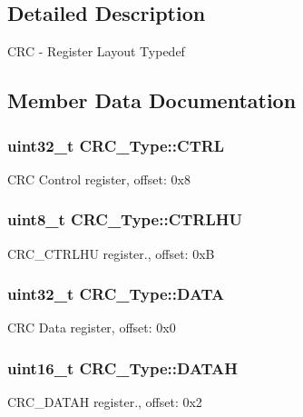 \subsection{Detailed Description}
C\+RC -\/ Register Layout Typedef 

\subsection{Member Data Documentation}
\subsubsection[{\texorpdfstring{C\+T\+RL}{CTRL}}]{ uint32\+\_\+t C\+R\+C\+\_\+\+Type\+::\+C\+T\+RL}\hypertarget{structCRC__Type_a147efe24d7fb3a460223461ecfedc883}{}\label{structCRC__Type_a147efe24d7fb3a460223461ecfedc883}
C\+RC Control register, offset\+: 0x8 
\subsubsection[{\texorpdfstring{C\+T\+R\+L\+HU}{CTRLHU}}]{ uint8\+\_\+t C\+R\+C\+\_\+\+Type\+::\+C\+T\+R\+L\+HU}\hypertarget{structCRC__Type_a50453164cb07ea98463dff9a9ee93a94}{}\label{structCRC__Type_a50453164cb07ea98463dff9a9ee93a94}
C\+R\+C\+\_\+\+C\+T\+R\+L\+HU register., offset\+: 0xB 
\subsubsection[{\texorpdfstring{D\+A\+TA}{DATA}}]{ uint32\+\_\+t C\+R\+C\+\_\+\+Type\+::\+D\+A\+TA}\hypertarget{structCRC__Type_a9c6ce5850e78685541e9476bd77b1710}{}\label{structCRC__Type_a9c6ce5850e78685541e9476bd77b1710}
C\+RC Data register, offset\+: 0x0 
\subsubsection[{\texorpdfstring{D\+A\+T\+AH}{DATAH}}]{ uint16\+\_\+t C\+R\+C\+\_\+\+Type\+::\+D\+A\+T\+AH}\hypertarget{structCRC__Type_a1638ce0ae66640d337c12b6790d4ba08}{}\label{structCRC__Type_a1638ce0ae66640d337c12b6790d4ba08}
C\+R\+C\+\_\+\+D\+A\+T\+AH register., offset\+: 0x2 
